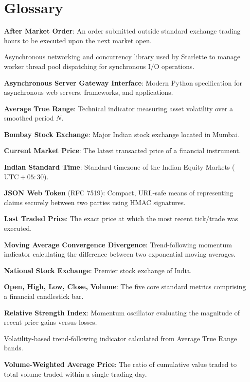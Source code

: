 \chapter{Glossary}
\label{ch:glossary}

\begin{description}[leftmargin=32mm,style=nextline,itemsep=2mm]
    \item[\textbf{AMO}] \textbf{After Market Order}: An order submitted outside standard exchange trading hours to be executed upon the next market open.
    \item[\textbf{AnyIO}] Asynchronous networking and concurrency library used by Starlette to manage worker thread pool dispatching for synchronous I/O operations.
    \item[\textbf{ASGI}] \textbf{Asynchronous Server Gateway Interface}: Modern Python specification for asynchronous web servers, frameworks, and applications.
    \item[\textbf{ATR}] \textbf{Average True Range}: Technical indicator measuring asset volatility over a smoothed period $N$.
    \item[\textbf{BSE}] \textbf{Bombay Stock Exchange}: Major Indian stock exchange located in Mumbai.
    \item[\textbf{CMP}] \textbf{Current Market Price}: The latest transacted price of a financial instrument.
    \item[\textbf{IST}] \textbf{Indian Standard Time}: Standard timezone of the Indian Equity Markets ($\text{UTC}+05:30$).
    \item[\textbf{JWT}] \textbf{JSON Web Token} (RFC 7519): Compact, URL-safe means of representing claims securely between two parties using HMAC signatures.
    \item[\textbf{LTP}] \textbf{Last Traded Price}: The exact price at which the most recent tick/trade was executed.
    \item[\textbf{MACD}] \textbf{Moving Average Convergence Divergence}: Trend-following momentum indicator calculating the difference between two exponential moving averages.
    \item[\textbf{NSE}] \textbf{National Stock Exchange}: Premier stock exchange of India.
    \item[\textbf{OHLCV}] \textbf{Open, High, Low, Close, Volume}: The five core standard metrics comprising a financial candlestick bar.
    \item[\textbf{RSI}] \textbf{Relative Strength Index}: Momentum oscillator evaluating the magnitude of recent price gains versus losses.
    \item[\textbf{Supertrend}] Volatility-based trend-following indicator calculated from Average True Range bands.
    \item[\textbf{VWAP}] \textbf{Volume-Weighted Average Price}: The ratio of cumulative value traded to total volume traded within a single trading day.
\end{description}
